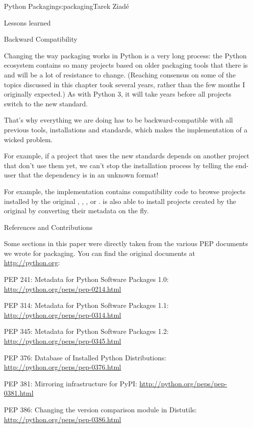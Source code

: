 \begin{aosachapter}{Python Packaging}{s:packaging}{Tarek Ziad\'{e}}
\begin{aosasect1}{Lessons learned}
\begin{aosasect2}{Backward Compatibility}

Changing the way packaging works in Python is a very long process: the
Python ecosystem contains so many projects based on older packaging
tools that there is and will be a lot of resistance to change.
(Reaching consensus on some of the topics discussed in this chapter
took several years, rather than the few months I originally
expected.)  As with Python 3, it will take years before all projects
switch to the new standard.

That's why everything we are doing has to be backward-compatible with 
all previous tools, installations and standards, which makes the 
implementation of  a wicked problem.

For example, if a project that uses the new standards depends on 
another project that don't use them yet, we can't stop the installation
process by telling the end-user that the dependency is in an unknown 
format!

For example, the  implementation contains compatibility code 
to browse projects installed by the original ,
, , or .
 is also able to install projects created by the
original  by converting their metadata on the fly.

\end{aosasect2}


\end{aosasect1}

\begin{aosasect1}{References and Contributions}

Some sections in this paper were directly taken from the various PEP
documents we wrote for packaging. You can find the original documents
at \url{http://python.org}:

\begin{aosaitemize}
  \item PEP 241: Metadata for Python Software Packages 1.0: \url{http://python.org/peps/pep-0214.html}
  \item PEP 314: Metadata for Python Software Packages 1.1: \url{http://python.org/peps/pep-0314.html}
  \item PEP 345: Metadata for Python Software Packages 1.2: \url{http://python.org/peps/pep-0345.html}
  \item PEP 376: Database of Installed Python Distributions: \url{http://python.org/peps/pep-0376.html}
  \item PEP 381: Mirroring infrastructure for PyPI: \url{http://python.org/peps/pep-0381.html}
  \item PEP 386: Changing the version comparison module in Distutils: \url{http://python.org/peps/pep-0386.html}
\end{aosaitemize}


\end{aosasect1}
\end{aosachapter}
